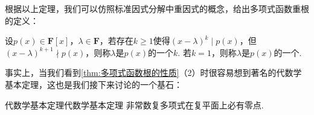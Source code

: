 根据以上定理，我们可以仿照标准因式分解中重因式的概念，给出多项式函数重根的定义：
\begin{definition}{}{}
    设$p(x)\in\mathbf{F}[x]$，$\lambda\in\mathbf{F}$，若存在$k\geqslant 1$使得$(x-\lambda)^k\mid p(x)$，但$(x-\lambda)^{k+1}\nmid p(x)$，则称$\lambda$是$p(x)$的一个$k$. 若$k=1$，则称$\lambda$是$p(x)$的一个.
\end{definition}

事实上，当我们看到\autoref{thm:多项式函数根的性质}（2）时很容易想到著名的代数学基本定理，这也是我们接下来讨论的一个基石：
\begin{theorem}{代数学基本定理}{代数学基本定理} 
    非常数复多项式在复平面上必有零点.
\end{theorem}

